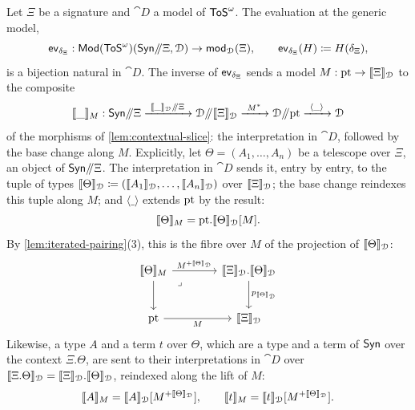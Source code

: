 \begin{proposition}\label{prop:classifying}
    Let $\Xi$ be a signature and $\cat{D}$ a model of $\mathsf{ToS}^\omega$. The evaluation at the generic model,
    \[
        \mathsf{ev}_{\delta_\Xi} : \mathsf{Mod}(\mathsf{ToS}^\omega)(\mathsf{Syn}\mathord{/\mkern-5mu/} \Xi, \mathcal{D}) \to \mathsf{mod}_{\mathcal{D}}(\Xi), \qquad \mathsf{ev}_{\delta_\Xi}(H) \coloneqq H(\delta_\Xi),
    \]
    is a bijection natural in $\cat{D}$.
    The inverse of $\mathsf{ev}_{\delta_\Xi}$ sends a model $M : \mathrm{pt} \to \llbracket\Xi\rrbracket_{\mathcal{D}}$ to the composite
    \[
        \sem{\_}_M : \Syn\dslash \Xi \xrightarrow{\ \sem{\_}_{\cat{D}} \dslash \Xi\ } \cat{D}\dslash \sem{\Xi}_{\cat{D}} \xrightarrow{\ M^*\ } \cat{D}\dslash \pt \xrightarrow{\ \langle \_ \rangle\ } \cat{D}
    \]
    of the morphisms of \cref{lem:contextual-slice}: the interpretation in $\cat{D}$, followed by the base change along $M$. Explicitly, let $\Theta = (A_1, \ldots, A_n)$ be a telescope over $\Xi$, an object of $\mathsf{Syn}\mathord{/\mkern-5mu/} \Xi$. The interpretation in $\cat{D}$ sends it, entry by entry, to the tuple of types $\llbracket\Theta\rrbracket_{\mathcal{D}} \coloneqq (\llbracket A_1\rrbracket_{\mathcal{D}}, \ldots, \llbracket A_n\rrbracket_{\mathcal{D}})$ over $\llbracket\Xi\rrbracket_{\mathcal{D}}$; the base change reindexes this tuple along $M$; and $\langle \_ \rangle$ extends $\mathrm{pt}$ by the result:
    \[
        \llbracket\Theta\rrbracket_M = \mathrm{pt}.\llbracket\Theta\rrbracket_{\mathcal{D}}[M].
    \]
    By \cref{lem:iterated-pairing}(3), this is the fibre over $M$ of the projection of $\llbracket\Theta\rrbracket_{\mathcal{D}}$:
    \[\begin{tikzcd}[column sep=4em, row sep=2.5em]
        {\sem{\Theta}_M} & {\sem{\Xi}_{\cat{D}}.\sem{\Theta}_{\cat{D}}} \\
        \pt & {\sem{\Xi}_{\cat{D}}}
        \arrow["{M^{+\sem{\Theta}_{\cat{D}}}}", from=1-1, to=1-2]
        \arrow[from=1-1, to=2-1]
        \arrow["\lrcorner"{anchor=center, pos=0.125}, draw=none, from=1-1, to=2-2]
        \arrow["{p_{\sem{\Theta}_{\cat{D}}}}", from=1-2, to=2-2]
        \arrow["M"', from=2-1, to=2-2]
    \end{tikzcd}\]
    Likewise, a type $A$ and a term $t$ over $\Theta$, which are a type and a term of $\mathsf{Syn}$ over the context $\Xi.\Theta$, are sent to their interpretations in $\cat{D}$ over $\llbracket\Xi.\Theta\rrbracket_{\mathcal{D}} = \llbracket\Xi\rrbracket_{\mathcal{D}}.\llbracket\Theta\rrbracket_{\mathcal{D}}$, reindexed along the lift of $M$:
    \[
        \llbracket A\rrbracket_M = \llbracket A\rrbracket_{\mathcal{D}}[M^{+\llbracket\Theta\rrbracket_{\mathcal{D}}}], \qquad \llbracket t\rrbracket_M = \llbracket t\rrbracket_{\mathcal{D}}[M^{+\llbracket\Theta\rrbracket_{\mathcal{D}}}].
    \]
\end{proposition}

